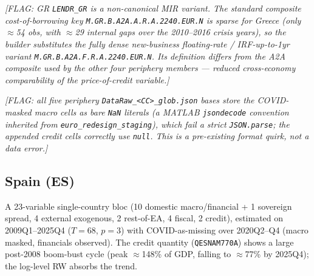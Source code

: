\textit{[FLAG: GR \texttt{LENDR\_GR} is a non-canonical MIR variant. The
standard composite cost-of-borrowing key \texttt{M.\allowbreak GR.\allowbreak B.\allowbreak A2A.\allowbreak A.\allowbreak R.\allowbreak A.2240.\allowbreak EUR.\allowbreak N}
is sparse for Greece (only $\approx$54 obs, with $\approx$29 internal gaps over
the 2010--2016 crisis years), so the builder substitutes the fully dense
new-business floating-rate / IRF-up-to-1yr variant
\texttt{M.\allowbreak GR.\allowbreak B.\allowbreak A2A.\allowbreak F.\allowbreak R.\allowbreak A.2240.\allowbreak EUR.\allowbreak N}. Its definition differs from the A2A
composite used by the other four periphery members --- reduced cross-economy
comparability of the price-of-credit variable.]}

\textit{[FLAG: all five periphery \texttt{DataRaw\_<CC>\_glob.json} bases store
the COVID-masked macro cells as bare \texttt{NaN} literals (a MATLAB
\texttt{jsondecode} convention inherited from \texttt{euro\_redesign\_staging}),
which fail a strict \texttt{JSON.parse}; the appended credit cells correctly use
\texttt{null}. This is a pre-existing format quirk, not a data error.]}

\subsection{Spain (ES)}\label{sec:data:ES}

A 23-variable single-country bloc (10 domestic macro/financial + 1 sovereign
spread, 4 external exogenous, 2 rest-of-EA, 4 fiscal, 2 credit), estimated on
2009Q1--2025Q4 ($T=68$, $p=3$) with COVID-as-missing over 2020Q2--Q4 (macro
masked, financials observed). The credit quantity (\texttt{QESNAM770A}) shows a
large post-2008 boom-bust cycle (peak $\approx$148\% of GDP, falling to
$\approx$77\% by 2025Q4); the log-level RW absorbs the trend.

